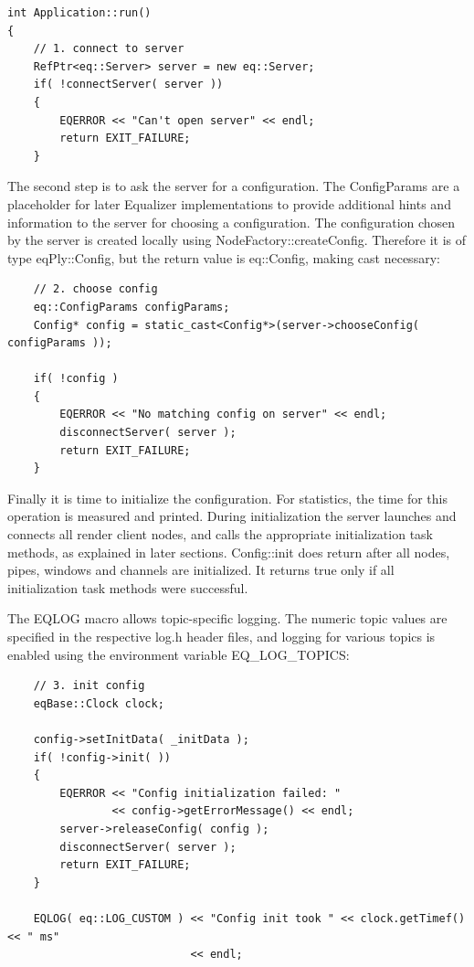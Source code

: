 \documentclass[10pt,a4]{scrartcl}
\begin{document}
{\footnotesize\begin{lstlisting}
int Application::run()
{
    // 1. connect to server
    RefPtr<eq::Server> server = new eq::Server;
    if( !connectServer( server ))
    {
        EQERROR << "Can't open server" << endl;
        return EXIT_FAILURE;
    }
\end{lstlisting}}%

The second step is to ask the server for a configuration. The
\textsf{ConfigParams} are a placeholder for later Equalizer
implementations to provide additional hints and information to the
server for choosing a configuration. The configuration chosen by the
server is created locally using
\textsf{NodeFactory::createConfig}. Therefore it is of type
\textsf{eqPly::Config}, but the return value is \textsf{eq::Config},
making cast necessary:

{\footnotesize\begin{lstlisting}
    // 2. choose config
    eq::ConfigParams configParams;
    Config* config = static_cast<Config*>(server->chooseConfig( configParams ));

    if( !config )
    {
        EQERROR << "No matching config on server" << endl;
        disconnectServer( server );
        return EXIT_FAILURE;
    }
\end{lstlisting}}%

Finally it is time to initialize the configuration. For statistics, the
time for this operation is measured and printed. During initialization
the server launches and connects all render client nodes, and calls the
appropriate initialization task methods, as explained in later
sections. \textsf{Config::init} does return after all nodes, pipes,
windows and channels are initialized. It returns \textsf{true} only if
all initialization task methods were successful.

The \textsf{EQLOG} macro allows topic-specific logging. The numeric
topic values are specified in the respective \textsf{log.h} header
files, and logging for various topics is enabled using the environment
variable \textsf{EQ\_LOG\_TOPICS}:

{\footnotesize\begin{lstlisting}
    // 3. init config
    eqBase::Clock clock;

    config->setInitData( _initData );
    if( !config->init( ))
    {
        EQERROR << "Config initialization failed: " 
                << config->getErrorMessage() << endl;
        server->releaseConfig( config );
        disconnectServer( server );
        return EXIT_FAILURE;
    }

    EQLOG( eq::LOG_CUSTOM ) << "Config init took " << clock.getTimef() << " ms"
                            << endl;
\end{lstlisting}}%
\end{document}
